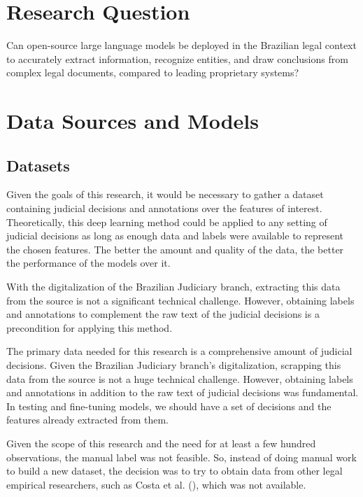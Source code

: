 \documentclass[
  12pt,
]{article}
\begin{document}
\section{Research Question}\label{sec-research_question}

Can open-source large language models be deployed in the Brazilian legal
context to accurately extract information, recognize entities, and draw
conclusions from complex legal documents, compared to leading
proprietary systems?

\section{Data Sources and Models}\label{sec-data_sources_models}

\subsection{Datasets}\label{sec-datasets}

Given the goals of this research, it would be necessary to gather a
dataset containing judicial decisions and annotations over the features
of interest. Theoretically, this deep learning method could be applied
to any setting of judicial decisions as long as enough data and labels
were available to represent the chosen features. The better the amount
and quality of the data, the better the performance of the models over
it.

With the digitalization of the Brazilian Judiciary branch, extracting
this data from the source is not a significant technical challenge.
However, obtaining labels and annotations to complement the raw text of
the judicial decisions is a precondition for applying this method.

The primary data needed for this research is a comprehensive amount of
judicial decisions. Given the Brazilian Judiciary branch's
digitalization, scrapping this data from the source is not a huge
technical challenge. However, obtaining labels and annotations in
addition to the raw text of judicial decisions was fundamental. In
testing and fine-tuning models, we should have a set of decisions and
the features already extracted from them.

Given the scope of this research and the need for at least a few hundred
observations, the manual label was not feasible. So, instead of doing
manual work to build a new dataset, the decision was to try to obtain
data from other legal empirical researchers, such as Costa et al.
(), which was not available.
\end{document}
